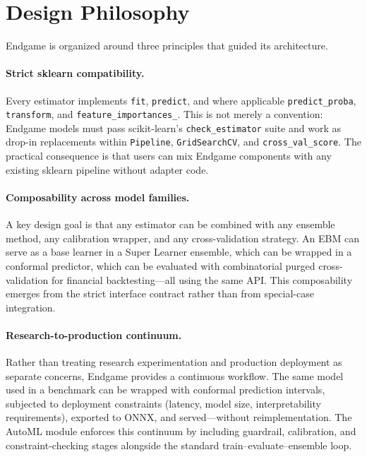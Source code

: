 \documentclass[11pt]{article}
\begin{document}
\section{Design Philosophy}
\label{sec:design}

Endgame is organized around three principles that guided its architecture.

\paragraph{Strict sklearn compatibility.} Every estimator implements
\texttt{fit}, \texttt{predict}, and where applicable \texttt{predict\_proba},
\texttt{transform}, and \texttt{feature\_importances\_}. This is not merely
a convention: Endgame models must pass scikit-learn's
\texttt{check\_estimator} suite and work as drop-in replacements within
\texttt{Pipeline}, \texttt{GridSearchCV}, and \texttt{cross\_val\_score}.
The practical consequence is that users can mix Endgame components with any
existing sklearn pipeline without adapter code.

\paragraph{Composability across model families.} A key design goal is that
any estimator can be combined with any ensemble method, any calibration
wrapper, and any cross-validation strategy. An EBM can serve as a base
learner in a Super Learner ensemble, which can be wrapped in a conformal
predictor, which can be evaluated with combinatorial purged cross-validation
for financial backtesting---all using the same API. This composability
emerges from the strict interface contract rather than from special-case
integration.

\paragraph{Research-to-production continuum.} Rather than treating research
experimentation and production deployment as separate concerns, Endgame
provides a continuous workflow. The same model used in a benchmark can be
wrapped with conformal prediction intervals, subjected to deployment
constraints (latency, model size, interpretability requirements), exported
to ONNX, and served---without reimplementation. The AutoML module enforces
this continuum by including guardrail, calibration, and constraint-checking
stages alongside the standard train--evaluate--ensemble loop.
\end{document}
